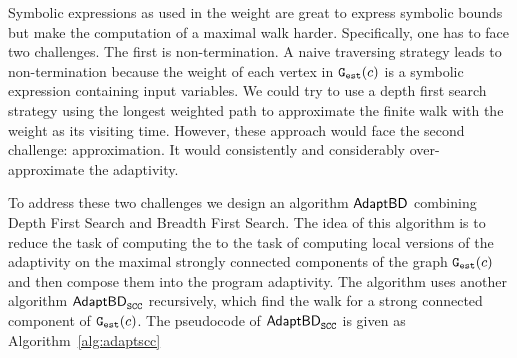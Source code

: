 Symbolic expressions as used in the weight  are great to express symbolic bounds but make the computation of 
a maximal walk harder. Specifically, one has to face two challenges. The first is non-termination.
A naive traversing strategy leads to non-termination
because the weight of each vertex in $\mathtt{{G_{est}}}({c})$
is a symbolic expression containing input variables.
We could try to use a depth first search strategy
using the longest weighted path to approximate
the finite walk with the weight as
its visiting time. However, these approach would face the second challenge: approximation.
It would consistently and considerably over-approximate the adaptivity.

To address these two challenges we design an algorithm $\mathsf{AdaptBD}$  combining 
Depth First Search and Breadth First Search.
The idea of this algorithm is to reduce the task of computing the
 to the task of computing local versions of the adaptivity on the maximal strongly connected components of the graph $\mathtt{{G_{est}}}(c)$ and then compose them into the program adaptivity. 
The algorithm  uses  
another algorithm $\mathsf{AdaptBD}_{\mathtt{SCC}}$  recursively, which find the { walk} for a strong connected component of $\mathtt{{G_{est}}}(c)$. The pseudocode of $\mathsf{AdaptBD}_{\mathtt{SCC}}$ is given as Algorithm~\ref{alg:adaptscc}

